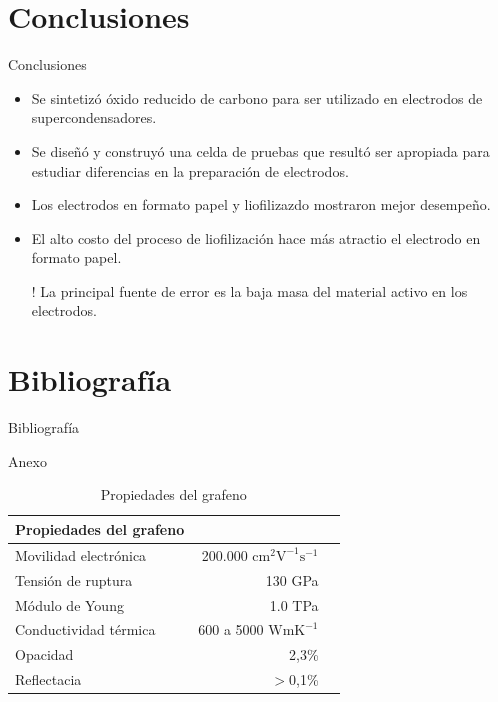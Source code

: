\documentclass[aspectratio=169]{beamer}
\begin{document}
	\section{Conclusiones}
	\begin{frame}{Conclusiones}
		\begin{itemize}[<+->]
			\item Se sintetizó óxido reducido de carbono para ser utilizado en electrodos de supercondensadores.
			\item Se diseñó y construyó una celda de pruebas que resultó ser apropiada para	estudiar diferencias en la preparación de electrodos.
			\item Los electrodos en formato papel y liofilizazdo mostraron mejor desempeño.
			\item El alto costo del proceso de liofilización hace más atractio el electrodo en formato papel.
			\item[!] La principal fuente de error es la baja masa del material activo en los electrodos.
		\end{itemize}
	\end{frame}

	

	\section{Bibliografía}
	\begin{frame}[allowframebreaks]{Bibliografía}
		
		
		
	\end{frame}

	\maketitle
	
	\begin{frame}{Anexo}
		\begin{table}[h!]
			\centering
			\begin{tabular}{ l r r }
				Propiedades del grafeno & & \\
				\hline
				Movilidad electrónica & 200.000 $\mathrm{cm^2 V^{-1} s^{-1} }$ & \citep{Bolotin2008}\\
				Tensión de ruptura & 130 GPa & \citep{Lee2008}\\
				Módulo de Young & 1.0 TPa & \citep{Lee2008}\\
				Conductividad térmica & 600 a 5000 $\mathrm{W mK^{-1}}$ & \citep{Balandin2011}\\
				Opacidad & 2,3\% &\citep{Nair2008}\\
				Reflectacia & $>$0,1\% & \citep{Nair2008}\\
			\end{tabular}
			\caption{Propiedades del grafeno}
		\end{table}
	\end{frame}
\end{document}
